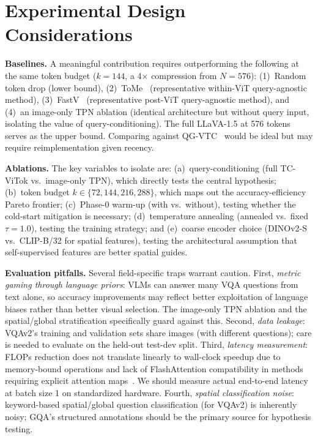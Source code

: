 \documentclass[11pt,twocolumn]{article}
\begin{document}
\section*{Experimental Design Considerations}
\label{sec:expdesign}

\textbf{Baselines.} A meaningful contribution requires outperforming the following at the same token budget ($k = 144$, a 4$\times$ compression from $N = 576$): (1)~Random token drop (lower bound), (2)~ToMe~\cite{bolya2022token} (representative within-ViT query-agnostic method), (3)~FastV~\cite{chen2024fastv} (representative post-ViT query-agnostic method), and (4)~an image-only TPN ablation (identical architecture but without query input, isolating the value of query-conditioning). The full LLaVA-1.5 at 576 tokens serves as the upper bound. Comparing against QG-VTC~\cite{li2025qgvtc} would be ideal but may require reimplementation given recency.

\textbf{Ablations.} The key variables to isolate are: (a)~query-conditioning (full TC-ViTok vs.\ image-only TPN), which directly tests the central hypothesis; (b)~token budget $k \in \{72, 144, 216, 288\}$, which maps out the accuracy-efficiency Pareto frontier; (c)~Phase-0 warm-up (with vs.\ without), testing whether the cold-start mitigation is necessary; (d)~temperature annealing (annealed vs.\ fixed $\tau = 1.0$), testing the training strategy; and (e)~coarse encoder choice (DINOv2-S vs.\ CLIP-B/32 for spatial features), testing the architectural assumption that self-supervised features are better spatial guides.

\textbf{Evaluation pitfalls.} Several field-specific traps warrant caution. First, \emph{metric gaming through language priors}: VLMs can answer many VQA questions from text alone, so accuracy improvements may reflect better exploitation of language biases rather than better visual selection. The image-only TPN ablation and the spatial/global stratification specifically guard against this. Second, \emph{data leakage}: VQAv2's training and validation sets share images (with different questions); care is needed to evaluate on the held-out test-dev split. Third, \emph{latency measurement}: FLOPs reduction does not translate linearly to wall-clock speedup due to memory-bound operations and lack of FlashAttention compatibility in methods requiring explicit attention maps~\cite{chen2024fastv}. We should measure actual end-to-end latency at batch size 1 on standardized hardware. Fourth, \emph{spatial classification noise}: keyword-based spatial/global question classification (for VQAv2) is inherently noisy; GQA's structured annotations should be the primary source for hypothesis testing.
\end{document}
